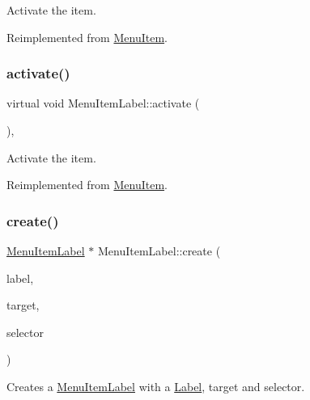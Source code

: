 Activate the item. 

Reimplemented from \hyperlink{classMenuItem_a2c5e2d7641bbf1dc9da877557c6c5e92}{Menu\+Item}.

\mbox{\label{classMenuItemLabel_a6a5e8b0d94a07126c084ec1ba1695c13}} 
\subsubsection{\texorpdfstring{activate()}{activate()}\hspace{0.1cm}{\footnotesize\ttfamily [2/2]}}
{\footnotesize\ttfamily virtual void Menu\+Item\+Label\+::activate (\begin{DoxyParamCaption}{ }\end{DoxyParamCaption})\hspace{0.3cm}{\ttfamily [override]}, {\ttfamily [virtual]}}

Activate the item. 

Reimplemented from \hyperlink{classMenuItem_a2c5e2d7641bbf1dc9da877557c6c5e92}{Menu\+Item}.

\mbox{\label{classMenuItemLabel_a982ea2eda2b4f99a2789df7f7b614582}} 
\subsubsection{\texorpdfstring{create()}{create()}\hspace{0.1cm}{\footnotesize\ttfamily [1/6]}}
{\footnotesize\ttfamily \hyperlink{classMenuItemLabel}{Menu\+Item\+Label} $\ast$ Menu\+Item\+Label\+::create (\begin{DoxyParamCaption}\item[{\hyperlink{classNode}{Node} $\ast$}]{label,  }\item[{\hyperlink{classRef}{Ref} $\ast$}]{target,  }\item[{S\+E\+L\+\_\+\+Menu\+Handler}]{selector }\end{DoxyParamCaption})\hspace{0.3cm}{\ttfamily [static]}}

Creates a \hyperlink{classMenuItemLabel}{Menu\+Item\+Label} with a \hyperlink{classLabel}{Label}, target and selector. \mbox{\label{classMenuItemLabel_ab21e9750d0fd3af00e2984ad62eef902}} 
